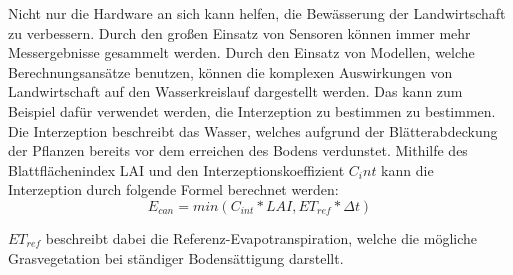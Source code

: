 Nicht nur die Hardware an sich kann helfen, die Bewässerung der Landwirtschaft
zu verbessern. Durch den großen Einsatz von Sensoren können immer mehr
Messergebnisse gesammelt werden. Durch den Einsatz von Modellen, welche
Berechnungsansätze benutzen, können die komplexen Auswirkungen von
Landwirtschaft auf den Wasserkreislauf dargestellt werden. Das kann zum
Beispiel dafür verwendet werden, die Interzeption zu bestimmen zu bestimmen.
Die Interzeption beschreibt das Wasser, welches aufgrund der Blätterabdeckung
der Pflanzen bereits vor dem erreichen des Bodens verdunstet. Mithilfe des
Blattflächenindex LAI und den Interzeptionskoeffizient $C_int$ kann die
Interzeption durch folgende Formel berechnet werden: \\
\begin{equation}
    E_{can} = min(C_{int} * LAI,ET_{ref} * \Delta t)
\end{equation}

$ET_{ref}$ beschreibt dabei die Referenz-Evapotranspiration, welche die mögliche Grasvegetation bei ständiger Bodensättigung darstellt.\cite{keilholz2019bewasserung}